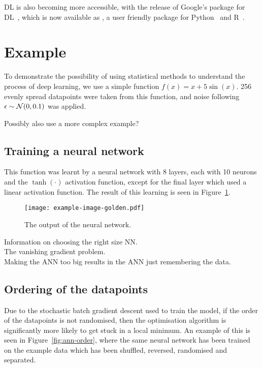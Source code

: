 \ac{DL} is also becoming more accessible, with the release of Google's  package for \ac{DL}~\autocite{abadi2016}, which is now available as , a user friendly package for Python~\autocite{chollet2015} and R~\autocite{allaire2018}.

\section{Example}

To demonstrate the possibility of using statistical methods to understand the process of deep learning, we use a simple function \(f(x) = x + 5 \sin(x)\).
256 evenly spread datapoints were taken from this function, and noise following \(\epsilon \sim \mathcal{N}(0, 0.1)\) was applied.

\begin{todo}
	Possibly also use a more complex example?
\end{todo}

\subsection{Training a neural network}

This function was learnt by a neural network with 8 layers, each with 10 neurons and the \(\tanh(\cdot)\) activation function, except for the final layer which used a linear activation function.
The result of this learning is seen in Figure~\ref{fig:ann-output}.

\begin{figure}[htbp]
	\centering
	\texttt{[image: example-image-golden.pdf]}
	\caption{The output of the neural network.}
	\label{fig:ann-output}
\end{figure}

\begin{todo}
	Information on choosing the right size NN. \\
	The vanishing gradient problem. \\
	Making the ANN too big results in the ANN just remembering the data.
\end{todo}

\subsection{Ordering of the datapoints}

Due to the stochastic batch gradient descent used to train the model, if the order of the datapoints is not randomised, then the optimisation algorithm is significantly more likely to get stuck in a local minimum.
An example of this is seen in Figure~\ref{fig:ann-order}, where the same neural network has been trained on the example data which has been shuffled, reversed, randomised and separated.

